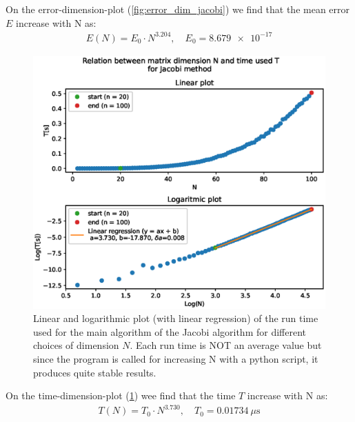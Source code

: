 \documentclass[american,a4paper,12pt]{article}
\begin{document}
On the error-dimension-plot (\ref{fig:error_dim_jacobi}) we find that the mean error $E$ increase with N as:
\begin{align*}
    E(N) = E_0 \cdot N^{3.204}, \quad E_0 = \num{8.679e-17}
\end{align*}
\begin{figure}[H]
    \centering
    \includegraphics[width = \textwidth]{figures/time_dim_jacobi.eps}
    \caption{Linear and logarithmic plot (with linear regression) of the run time used for the main algorithm of the Jacobi algorithm for different choices of dimension $N$. Each run time is NOT an average value but since the program is called for increasing N with a python script, it produces quite stable results.}
    \label{fig:time_dim_jacobi}
\end{figure}
On the time-dimension-plot (\ref{fig:time_dim_jacobi}) wee find that the time $T$ increase with N as:
\begin{align*}
    T(N) = T_0 \cdot N^{3.730}, \quad T_0 = 0.01734 \ \mu \text{s}
\end{align*}

\newpage
\end{document}
